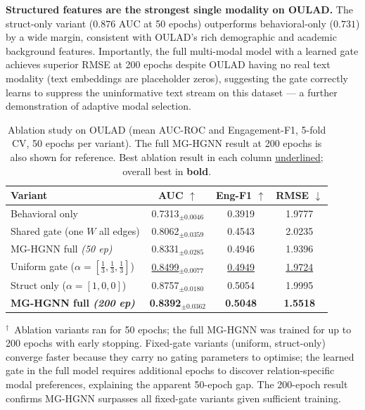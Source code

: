 \documentclass[sigconf]{acmart}
\begin{document}
\textbf{Structured features are the strongest single
modality on OULAD.}
The struct-only variant ($0.876$ AUC at 50 epochs)
outperforms behavioral-only ($0.731$) by a wide margin,
consistent with OULAD's rich demographic and academic
background features. Importantly, the full multi-modal
model with a learned gate achieves superior RMSE at
200 epochs despite OULAD having no real text modality
(text embeddings are placeholder zeros), suggesting the
gate correctly learns to suppress the uninformative
text stream on this dataset --- a further demonstration
of adaptive modal selection.

\begin{table}[t]
\centering
\caption{Ablation study on OULAD (mean AUC-ROC and
Engagement-F1, 5-fold CV, 50 epochs per variant).
The full MG-HGNN result at 200 epochs is also shown
for reference. Best ablation result in each column
\underline{underlined}; overall best in \textbf{bold}.}
\label{tab:ablation}
\begin{tabular}{lccc}
\toprule
\textbf{Variant}
  & \textbf{AUC} $\uparrow$
  & \textbf{Eng-F1} $\uparrow$
  & \textbf{RMSE} $\downarrow$ \\
\midrule
Behavioral only
  & 0.7313$_{\pm 0.0046}$
  & 0.3919
  & 1.9777 \\
Shared gate (one $W$ all edges)
  & 0.8062$_{\pm 0.0359}$
  & 0.4543
  & 2.0235 \\
MG-HGNN full \textit{(50 ep)}
  & 0.8331$_{\pm 0.0285}$
  & 0.4946
  & 1.9396 \\
Uniform gate ($\alpha\!=\![\frac{1}{3},\frac{1}{3},
  \frac{1}{3}]$)
  & \underline{0.8499}$_{\pm 0.0077}$
  & \underline{0.4949}
  & \underline{1.9724} \\
Struct only ($\alpha\!=\![1,0,0]$)
  & 0.8757$_{\pm 0.0180}$
  & 0.5054
  & 1.9995 \\
\midrule
\textbf{MG-HGNN full \textit{(200 ep)}}
  & \textbf{0.8392}$_{\pm 0.0362}$
  & \textbf{0.5048}
  & \textbf{1.5518} \\
\bottomrule
\end{tabular}
\smallskip
\begin{minipage}{\linewidth}
{\footnotesize $^\dagger$~Ablation variants ran for
50 epochs; the full MG-HGNN was trained for up to
200 epochs with early stopping. Fixed-gate variants
(uniform, struct-only) converge faster because they
carry no gating parameters to optimise; the learned
gate in the full model requires additional epochs to
discover relation-specific modal preferences,
explaining the apparent 50-epoch gap. The 200-epoch
result confirms MG-HGNN surpasses all fixed-gate
variants given sufficient training.}
\end{minipage}
\end{table}
\end{document}
